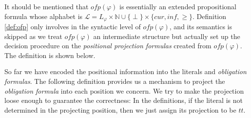 \documentclass[conference]{IEEEtran}
\newtheorem{definition}{Definition}
\def\phi{\varphi}
\def\ff{\mathit{ff}}
\def\tt{\mathit{tt}}
\def\ofp#1{\mathit{ofp}(#1)}
\def\nondeter{\perp}
\def\cur{\mathit{cur}}
\def\inf{\mathit{inf}}
\begin{document}
It should be mentioned that $\ofp{\phi}$ is essentially an extended propositional formula whose alphabet is 
$\mathcal{L}=L_\phi\times\mathbb{N}\cup\{\nondeter\}\times\{\cur,\inf,\geq\}$. Definition 
\ref{def:ofp} only involves in the syntactic level of $\ofp{\phi}$, and its semantics is skipped as 
we treat $\ofp{\phi}$ an intermediate structure but actually set up the decision procedure on the \textit{positional projection formulas} 
created from $\ofp{\phi}$. The definition is shown below. 

So far we have encoded the positional information into the literals and \textit{obligation formulas}. 
The following definition provides us a mechanism to project the \textit{obligation formula} into each position we 
concern. We try to make the projection loose enough to guarantee the correctness: In the definitions, if 
the literal is not determined in the projecting position, then we just assign 
its projection to be $\tt$.

\iffalse
\begin{definition}[Positional Projection on Literals]\label{def:literal_projection}
    Let $l\in \mathcal{L}$, then we denote $l\!\downarrow_i$ as 
    $l$'s projection under the position $i$, and we define $l\!\downarrow_i\equiv\tt$ iff 
    1). $l.start=i$, or 2). $l.start < i$ and $l.duration = \ge$. Otherwise we define $l\!\downarrow_i\equiv\ff$
\end{definition}

The projection on a literal tells us whether the literal needs to be satisfied at the given position. For example, 
consider the formula $\phi=GX(a\wedge bUc)$ and thus $\ofp{\phi}=\langle a, 1, \geq\rangle \wedge\langle c, 
\nondeter, \geq\rangle$. 
Let $l_1=\langle a, 1, \geq\rangle$ and $l_2=\langle c, 
\nondeter, \geq\rangle$, then according to 
Definition \ref{def:literal_projection} we have $l_1\!\downarrow_0\equiv\ff$, 
$l_1\!\downarrow_1\equiv\tt$ (since $l_1.start=1$) and $l_1\!\downarrow_i\equiv\tt$ for every $i> 1$ (since $l_1.start<i$ and 
$l_1.duration=\geq$). Note also $l_2\!\downarrow_i\equiv\ff$ for all $i\geq 0$, and it is because $l_2.start=
\nondeter$ which is 
undetermined so that its projection for every position is $\ff$. Next, we extend the projection to the obligation formula:
\fi
  
\end{document}
